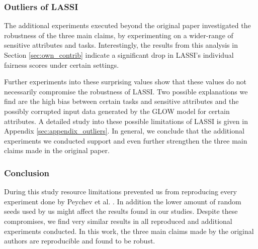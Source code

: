 \subsubsection{Outliers of LASSI}\label{subsec:outliers} The additional experiments executed beyond the original paper investigated the robustness of the three main claims, by experimenting on a wider-range of sensitive attributes and tasks. Interestingly, the results from this analysis in Section \ref{sec:own_contrib} indicate a significant drop in LASSI's individual fairness scores under certain settings. \newline

Further experiments into these surprising values show that these values do not necessarily compromise the robustness of LASSI. Two possible explanations we find are the high bias between certain tasks and sensitive attributes and the possibly corrupted input data generated by the GLOW model for certain attributes. A detailed study into these possible limitations of LASSI is given in Appendix \ref{sec:appendix_outliers}. In general, we conclude that the additional experiments we conducted support and even further strengthen the three main claims made in the original paper.

\subsubsection{Conclusion} During this study resource limitations prevented us from reproducing every experiment done by Peychev et al. \cite{peychev2022latent}. In addition the lower amount of random seeds used by us might affect the results found in our studies. Despite these compromises, we find very similar results in all reproduced and additional experiments conducted. In this work, the three main claims made by the original authors are reproducible and found to be robust.



